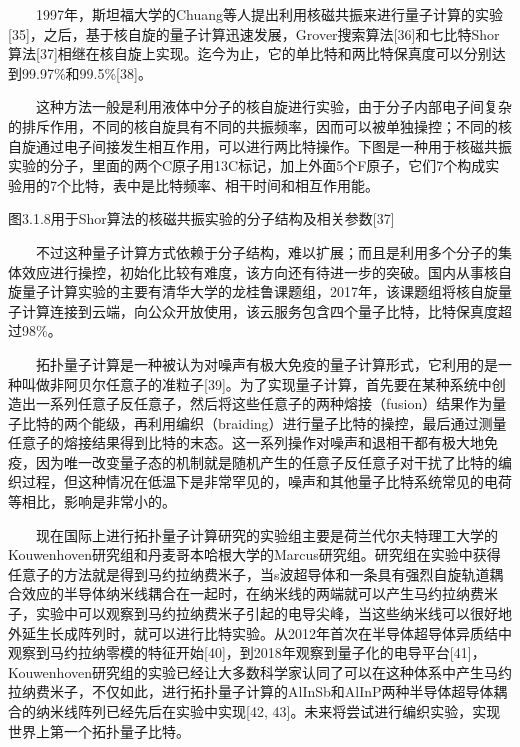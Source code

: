 \documentclass[a4paper,11pt,english]{sphinxmanual}
\begin{document}
\sphinxAtStartPar
{}

\sphinxAtStartPar
  1997年，斯坦福大学的Chuang等人提出利用核磁共振来进行量子计算的实验{[}35{]}，之后，基于核自旋的量子计算迅速发展，Grover搜索算法{[}36{]}和七比特Shor算法{[}37{]}相继在核自旋上实现。迄今为止，它的单比特和两比特保真度可以分别达到99.97\%和99.5\%{[}38{]}。

\sphinxAtStartPar
  这种方法一般是利用液体中分子的核自旋进行实验，由于分子内部电子间复杂的排斥作用，不同的核自旋具有不同的共振频率，因而可以被单独操控；不同的核自旋通过电子间接发生相互作用，可以进行两比特操作。下图是一种用于核磁共振实验的分子，里面的两个C原子用13C标记，加上外面5个F原子，它们7个构成实验用的7个比特，表中是比特频率、相干时间和相互作用能。


\begin{center}图3.1.8用于Shor算法的核磁共振实验的分子结构及相关参数{[}37{]}
\end{center}
\sphinxAtStartPar
  不过这种量子计算方式依赖于分子结构，难以扩展；而且是利用多个分子的集体效应进行操控，初始化比较有难度，该方向还有待进一步的突破。国内从事核自旋量子计算实验的主要有清华大学的龙桂鲁课题组，2017年，该课题组将核自旋量子计算连接到云端，向公众开放使用，该云服务包含四个量子比特，比特保真度超过98\%。

\sphinxAtStartPar
{}

\sphinxAtStartPar
  拓扑量子计算是一种被认为对噪声有极大免疫的量子计算形式，它利用的是一种叫做非阿贝尔任意子的准粒子{[}39{]}。为了实现量子计算，首先要在某种系统中创造出一系列任意子\sphinxhyphen{}反任意子，然后将这些任意子的两种熔接（fusion）结果作为量子比特的两个能级，再利用编织（braiding）进行量子比特的操控，最后通过测量任意子的熔接结果得到比特的末态。这一系列操作对噪声和退相干都有极大地免疫，因为唯一改变量子态的机制就是随机产生的任意子\sphinxhyphen{}反任意子对干扰了比特的编织过程，但这种情况在低温下是非常罕见的，噪声和其他量子比特系统常见的电荷等相比，影响是非常小的。

\sphinxAtStartPar
  现在国际上进行拓扑量子计算研究的实验组主要是荷兰代尔夫特理工大学的Kouwenhoven研究组和丹麦哥本哈根大学的Marcus研究组。研究组在实验中获得任意子的方法就是得到马约拉纳费米子，当s波超导体和一条具有强烈自旋\sphinxhyphen{}轨道耦合效应的半导体纳米线耦合在一起时，在纳米线的两端就可以产生马约拉纳费米子，实验中可以观察到马约拉纳费米子引起的电导尖峰，当这些纳米线可以很好地外延生长成阵列时，就可以进行比特实验。从2012年首次在半导体\sphinxhyphen{}超导体异质结中观察到马约拉纳零模的特征开始{[}40{]}，到2018年观察到量子化的电导平台{[}41{]}，Kouwenhoven研究组的实验已经让大多数科学家认同了可以在这种体系中产生马约拉纳费米子，不仅如此，进行拓扑量子计算的Al\sphinxhyphen{}InSb和Al\sphinxhyphen{}InP两种半导体\sphinxhyphen{}超导体耦合的纳米线阵列已经先后在实验中实现{[}42, 43{]}。未来将尝试进行编织实验，实现世界上第一个拓扑量子比特。
\end{document}
